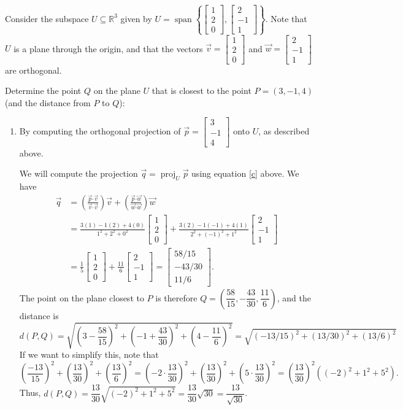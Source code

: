 \documentclass[letterpaper,12pt]{article}
\newcommand{\R}{\mathbb{R}}
\newcommand{\dotp}{\boldsymbol{\cdot}}
\newcommand{\bbm}{\begin{bmatrix}}
\newcommand{\ebm}{\end{bmatrix}}
\DeclareMathOperator{\proj}{proj}
\begin{document}
\begin{enumerate}
Consider the subspace $U\subseteq \R^3$ given by $U = \operatorname{span}\left\{\bbm 1\\2\\0\ebm, \bbm 2\\-1\\1\ebm\right\}$. Note that $U$ is a plane through the origin, and that the vectors $\vec{v} = \bbm 1\\2\\0\ebm$ and $\vec{w}=\bbm 2\\-1\\1\ebm$ are orthogonal.

Determine the point $Q$ on the plane $U$ that is closest to the point $P=(3,-1,4)$ (and the distance from $P$ to $Q$):
\begin{enumerate}
 \item By computing the orthogonal projection of $\vec{p} = \bbm 3\\-1\\4\ebm$ onto $U$, as described above.

\bigskip

We will compute the projection $\vec{q}=\proj_U\vec{p}$ using equation \eqref{c} above. We have
\begin{align*}
 \vec{q} &= \left(\frac{\vec{p}\dotp\vec{v}}{\vec{v}\dotp\vec{v}}\right)\vec{v}+\left(\frac{\vec{p}\dotp\vec{w}}{\vec{w}\dotp\vec{w}}\right)\vec{w}\\
	 &= \frac{3(1)-1(2)+4(0)}{1^2+2^2+0^2}\bbm 1\\2\\0\ebm + \frac{3(2)-1(-1)+4(1)}{2^2+(-1)^2+1^2}\bbm 2\\-1\\1\ebm\\
	 & = \frac{1}{5}\bbm 1\\2\\0\ebm + \frac{11}{6}\bbm 2\\-1\\1\ebm = \bbm 58/15\\-43/30\\11/6\ebm.
\end{align*}
The point on the plane closest to $P$ is therefore $Q=\left(\dfrac{58}{15}, -\dfrac{43}{30}, \dfrac{11}{6}\right)$, and the distance is
\[
 d(P,Q) = \sqrt{\left(3-\frac{58}{15}\right)^2+\left(-1+\frac{43}{30}\right)^2+\left(4-\frac{11}{6}\right)^2} = \sqrt{(-13/15)^2+(13/30)^2+(13/6)^2}
\]
If we want to simplify this, note that
\[
 \left(\frac{-13}{15}\right)^2+\left(\frac{13}{30}\right)^2+\left(\frac{13}{6}\right)^2 = \left(-2\cdot\frac{13}{30}\right)^2+\left(\frac{13}{30}\right)^2+\left(5\cdot\frac{13}{30}\right)^2 = \left(\frac{13}{30}\right)^2((-2)^2+1^2+5^2).
\]
Thus, $d(P,Q) = \dfrac{13}{30}\sqrt{(-2)^2+1^2+5^2} = \dfrac{13}{30}\sqrt{30} = \dfrac{13}{\sqrt{30}}$.


\end{enumerate}
\end{enumerate}
\end{document}
